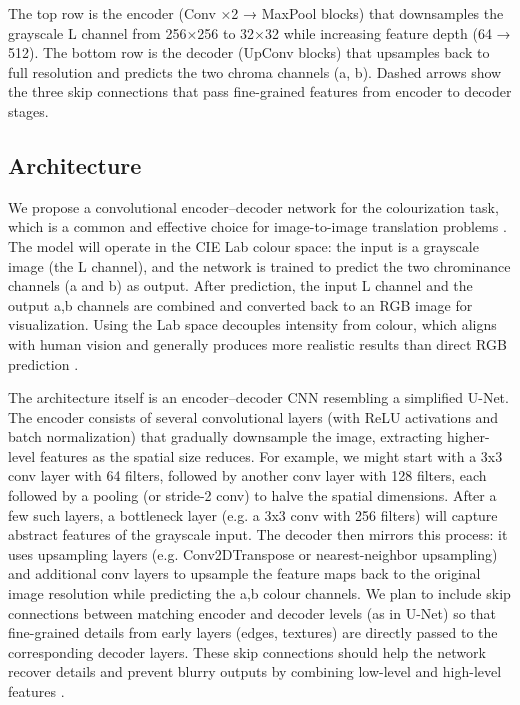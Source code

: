 \documentclass{article} %
\begin{document}
The top row is the encoder (Conv ×2 → MaxPool blocks) that downsamples the grayscale L channel from 256×256 to 32×32 while increasing feature depth (64 → 512).
The bottom row is the decoder (UpConv blocks) that upsamples back to full resolution and predicts the two chroma channels (a, b). Dashed arrows show the three skip connections that pass fine-grained features from encoder to decoder stages.

\subsection{Architecture}

We propose a convolutional encoder–decoder network for the colourization task, which is a common and effective choice for image-to-image translation problems \citep{leatvanich2025image}. The model will operate in the CIE Lab colour space: the input is a grayscale image (the L channel), and the network is trained to predict the two chrominance channels (a and b) as output. After prediction, the input L channel and the output a,b channels are combined and converted back to an RGB image for visualization. Using the Lab space decouples intensity from colour, which aligns with human vision and generally produces more realistic results than direct RGB prediction \citep{leatvanich2025image}.

The architecture itself is an encoder–decoder CNN resembling a simplified U-Net. The encoder consists of several convolutional layers (with ReLU activations and batch normalization) that gradually downsample the image, extracting higher-level features as the spatial size reduces. For example, we might start with a 3x3 conv layer with 64 filters, followed by another conv layer with 128 filters, each followed by a pooling (or stride-2 conv) to halve the spatial dimensions. After a few such layers, a bottleneck layer (e.g. a 3x3 conv with 256 filters) will capture abstract features of the grayscale input. The decoder then mirrors this process: it uses upsampling layers (e.g. Conv2DTranspose or nearest-neighbor upsampling) and additional conv layers to upsample the feature maps back to the original image resolution while predicting the a,b colour channels. We plan to include skip connections between matching encoder and decoder levels (as in U-Net) so that fine-grained details from early layers (edges, textures) are directly passed to the corresponding decoder layers. These skip connections should help the network recover details and prevent blurry outputs by combining low-level and high-level features \cite{leatvanich2025image}.
\end{document}
